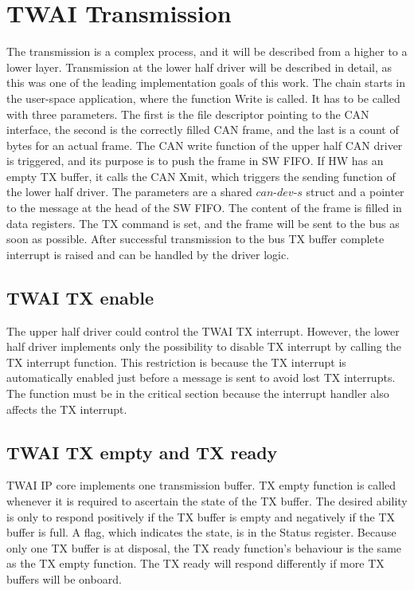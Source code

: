 \documentclass{ctuthesis}
\begin{document}
 \section{TWAI Transmission}
 The transmission is a complex process, and it will be described from a higher to a lower layer. Transmission at the lower half driver will be described in detail, as this was one of the leading implementation goals of this work. The chain starts in the user-space application, where the function Write is called. It has to be called with three parameters. The first is the file descriptor pointing to the CAN interface, the second is the correctly filled CAN frame, and the last is a count of bytes for an actual frame. The CAN write function of the upper half CAN driver is triggered, and its purpose is to push the frame in SW FIFO. If HW has an empty TX buffer, it calls the CAN Xmit, which triggers the sending function of the lower half driver. The parameters are a shared  $can\text{-}dev\text{-}s$ struct and a pointer to the message at the head of the SW FIFO. The content of the frame is filled in data registers. The TX command is set, and the frame will be sent to the bus as soon as possible. After successful transmission to the bus TX buffer complete interrupt is raised and can be handled by the driver logic.
 
 \subsection{TWAI TX enable}
 The upper half driver could control the TWAI TX interrupt. However, the lower half driver implements only the possibility to disable TX interrupt by calling the TX interrupt function. This restriction is because the TX interrupt is automatically enabled just before a message is sent to avoid lost TX interrupts. The function must be in the critical section because the interrupt handler also affects the TX interrupt.
 
 \subsection{TWAI TX empty and TX ready}
 TWAI IP core implements one transmission buffer. TX empty function is called whenever it is required to ascertain the state of the TX buffer. The desired ability is only to respond positively if the TX buffer is empty and negatively if the TX buffer is full. A flag, which indicates the state, is in the Status register. Because only one TX buffer is at disposal, the TX ready function's behaviour is the same as the TX empty function. The TX ready will respond differently if more TX buffers will be onboard.
 
\end{document}
